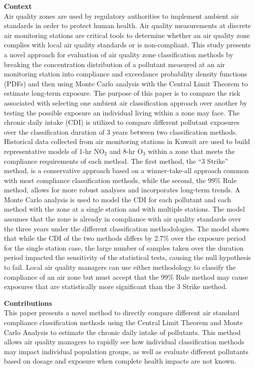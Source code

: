 \vspace{5mm}
\noindent
\textbf{Context}\\
\noindent
Air quality zones are used by regulatory authorities to implement ambient air standards in order to protect human health. Air quality measurements at discrete air monitoring stations are critical tools to determine whether an air quality zone complies with local air quality standards or is non-compliant. This study presents a novel approach for evaluation of air quality zone classification methods by breaking the concentration distribution of a pollutant measured at an air monitoring station into compliance and exceedance probability density functions (PDFs) and then using Monte Carlo analysis with the Central Limit Theorem to estimate long-term exposure. The purpose of this paper is to compare the risk associated with selecting one ambient air classification approach over another by testing the possible exposure an individual living within a zone may face. The chronic daily intake (CDI) is utilized to compare different pollutant exposures over the classification duration of 3 years between two classification methods. Historical data collected from air monitoring stations in Kuwait are used to build representative models of 1-hr NO$_{2}$ and 8-hr O$_{3}$ within a zone that meets the compliance requirements of each method. The first method, the “3 Strike” method, is a conservative approach based on a winner-take-all approach common with most compliance classification methods, while the second, the 99\% Rule method, allows for more robust analyses and incorporates long-term trends. A Monte Carlo analysis is used to model the CDI for each pollutant and each method with the zone at a single station and with multiple stations. The model assumes that the zone is already in compliance with air quality standards over the three years under the different classification methodologies. The model shows that while the CDI of the two methods differs by 2.7\% over the exposure period for the single station case, the large number of samples taken over the duration period impacted the sensitivity of the statistical tests, causing the null hypothesis to fail. Local air quality managers can use either methodology to classify the compliance of an air zone but must accept that the 99\% Rule method may cause exposures that are statistically more significant than the 3 Strike method. 

\vspace{5mm}
\noindent
\textbf{Contributions}\\
\noindent
This paper presents a novel method to directly compare different air standard compliance classification methods using the Central Limit Theorem and Monte Carlo Analysis to estimate the chronic daily intake of pollutants. This method allows air quality managers to rapidly see how individual classification methods may impact individual population groups, as well as evaluate different pollutants based on dosage and exposure when complete health impacts are not known.

